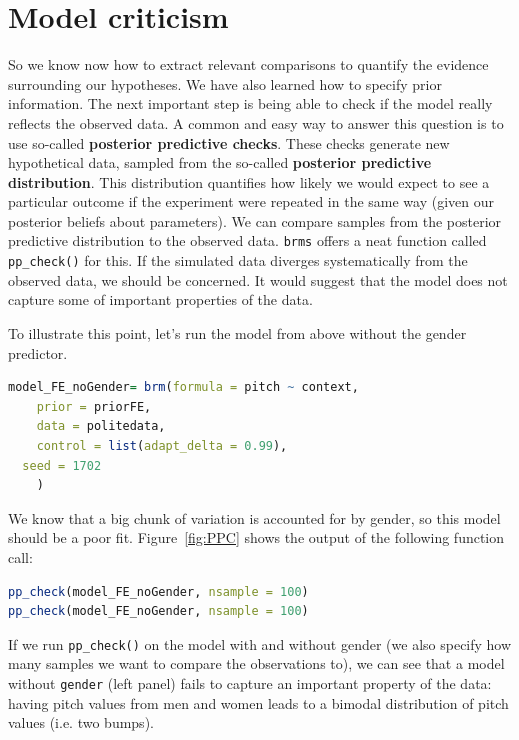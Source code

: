 \documentclass[nobib]{tufte-handout}
\begin{document}
\section{Model criticism}

So we know now how to extract relevant comparisons to quantify the evidence surrounding our hypotheses. We have also learned how to specify prior information. The next important step is being able to check if the model really reflects the observed data. A common and easy way to answer this question is to use so-called \textbf{posterior predictive checks}. These checks generate new hypothetical data, sampled from the so-called \textbf{posterior predictive distribution}. This distribution quantifies how likely we would expect to see a particular outcome if the experiment were repeated in the same way  (given our posterior beliefs about parameters). We can compare samples from the posterior predictive distribution to the observed data. \texttt{brms} offers a neat function called \texttt{pp\_check()} for this. If the simulated data diverges systematically from the observed data, we should be concerned. It would suggest that the model does not capture some of important properties of the data. 

To illustrate this point, let's run the model from above without the gender predictor. 

\bigskip

\begin{minipage}[]{1\textwidth}
\begin{lstlisting}[language=R]
model_FE_noGender= brm(formula = pitch ~ context,
	prior = priorFE,
	data = politedata,
	control = list(adapt_delta = 0.99),
  seed = 1702
	)
\end{lstlisting}
\end{minipage}

We know that a big chunk of variation is accounted for by gender, so this model should be a
poor fit. Figure~\ref{fig:PPC} shows the output of the following function call:

\bigskip

\begin{minipage}[]{1\textwidth}
\begin{lstlisting}[language=R]
pp_check(model_FE_noGender, nsample = 100)
pp_check(model_FE_noGender, nsample = 100)
\end{lstlisting}
\end{minipage}

If we run \texttt{pp\_check()} on the model with and without gender (we also specify how many samples we want
to compare the observations to), we can see that a model without \texttt{gender} (left panel)
fails to capture an important property of the data: having pitch values from men and women
leads to a bimodal distribution of pitch values (i.e. two bumps).
\end{document}
